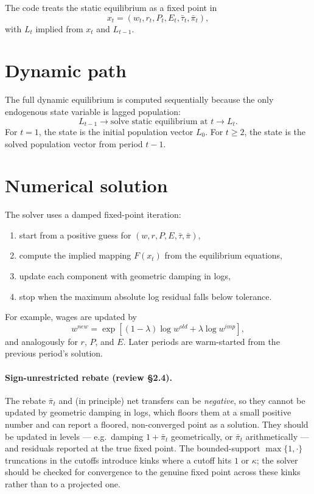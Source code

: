 \documentclass[11pt]{article}
\begin{document}
The code treats the static equilibrium as a fixed point in
\[
  x_t = (w_t, r_t, P_t, E_t, \bar\tau_t, \bar\pi_t),
\]
with $L_t$ implied from $x_t$ and $L_{t-1}$.

\section{Dynamic path}
The full dynamic equilibrium is computed sequentially because the only endogenous
state variable is lagged population:
\begin{equation}
  L_{t-1} \longrightarrow \text{solve static equilibrium at } t \longrightarrow L_t.
\end{equation}
For $t=1$, the state is the initial population vector $L_0$. For $t \ge 2$, the
state is the solved population vector from period $t-1$.

\section{Numerical solution}
The solver uses a damped fixed-point iteration:
\begin{enumerate}[leftmargin=1.5em]
\item start from a positive guess for $(w,r,P,E,\bar\tau,\bar\pi)$,
\item compute the implied mapping $F(x_t)$ from the equilibrium equations,
\item update each component with geometric damping in logs,
\item stop when the maximum absolute log residual falls below tolerance.
\end{enumerate}

For example, wages are updated by
\begin{equation}
  w^{new} = \exp\left[(1-\lambda)\log w^{old} + \lambda \log w^{imp}\right],
\end{equation}
and analogously for $r$, $P$, and $E$. Later periods are warm-started from the previous
period's solution.

\paragraph{Sign-unrestricted rebate (review \S2.4).} The rebate $\bar\pi_t$ and (in
principle) net transfers can be \emph{negative}, so they cannot be updated by geometric
damping in logs, which floors them at a small positive number and can report a floored,
non-converged point as a solution. They should be updated in levels --- e.g.\ damping
$1+\bar\pi_t$ geometrically, or $\bar\pi_t$ arithmetically --- and residuals reported at
the true fixed point. The bounded-support $\max\{1,\cdot\}$ truncations in the cutoffs
introduce kinks where a cutoff hits $1$ or $\kappa$; the solver should be checked for
convergence to the genuine fixed point across these kinks rather than to a projected one.
\end{document}
